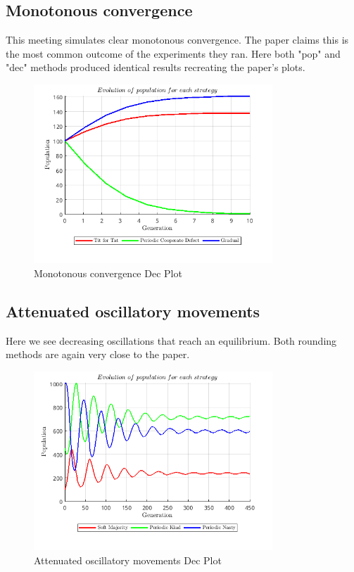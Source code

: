 \documentclass[12pt]{article}
\begin{document}
\subsection{Monotonous convergence}
This meeting simulates clear monotonous convergence. The paper claims this is the most common outcome of the experiments they ran. Here both "pop" and "dec" methods produced identical results recreating the paper's plots. 
\begin{figure}[H]
    \centering
    \includegraphics[width=0.8\textwidth]{media/monotonous_convergence_dec.png}
    \caption{Monotonous convergence Dec Plot}
\end{figure}

\subsection{Attenuated oscillatory movements}
Here we see decreasing oscillations that reach an equilibrium. Both rounding methods are again very close to the paper.
\begin{figure}[H]
    \centering
    \includegraphics[width=0.8\textwidth]{media/attenuated_oscillatory_movements_dec.png}
    \caption{Attenuated oscillatory movements Dec Plot}
\end{figure}
\end{document}
